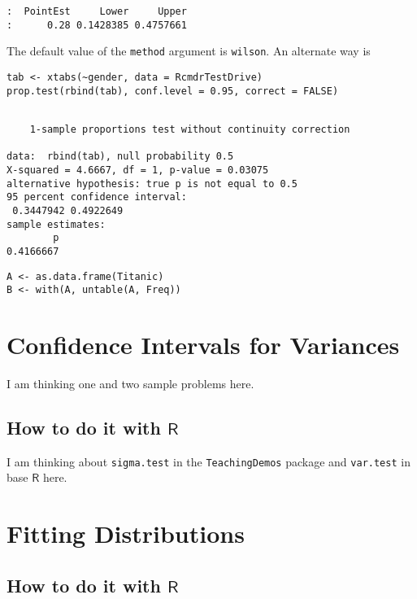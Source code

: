 \begin{verbatim}
:  PointEst     Lower     Upper
:      0.28 0.1428385 0.4757661
\end{verbatim}

The default value of the \texttt{method} argument is \texttt{wilson}.  An alternate way is 
\begin{verbatim}
tab <- xtabs(~gender, data = RcmdrTestDrive)
prop.test(rbind(tab), conf.level = 0.95, correct = FALSE)
\end{verbatim}

\begin{verbatim}

	1-sample proportions test without continuity correction

data:  rbind(tab), null probability 0.5
X-squared = 4.6667, df = 1, p-value = 0.03075
alternative hypothesis: true p is not equal to 0.5
95 percent confidence interval:
 0.3447942 0.4922649
sample estimates:
        p 
0.4166667
\end{verbatim}

\begin{verbatim}
A <- as.data.frame(Titanic)
B <- with(A, untable(A, Freq))
\end{verbatim}

\section{Confidence Intervals for Variances}
\label{sec-9-5}

I am thinking one and two sample problems here.

\subsection{How to do it with \(\mathsf{R}\)}
\label{sec-9-5-1}

I am thinking about \texttt{sigma.test} in the \texttt{TeachingDemos} package
\cite{TeachingDemos} and \texttt{var.test} in base \(\mathsf{R}\) \cite{base}
here.

\section{Fitting Distributions}
\label{sec-9-6}

\subsection{How to do it with \(\mathsf{R}\)}
\label{sec-9-6-1}


